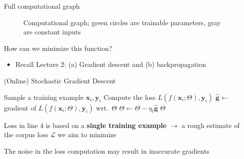 \documentclass[12pt,aspectratio=169,handout]{beamer}
\begin{document}
\begin{frame}{Full computational graph}
\begin{figure}
	\caption{Computational graph; green circles are trainable parameters, gray are constant inputs}
\end{figure}

How can we minimize this function?

\pause
\begin{itemize}
	\item Recall Lecture 2: (a) Gradient descent and (b) backpropagation
\end{itemize}

\end{frame}

\begin{frame}{(Online) Stochastic Gradient Descent}

\begin{algorithmic}[1]
		\State Sample a training example $\bm{x}_i, \bm{y}_i$
		\State Compute the loss $L(f(\bm{x}_i; \Theta), \bm{y}_i)$
		\State $\hat{\bm{g}} \gets$ gradient of $L(f(\bm{x}_i; \Theta), \bm{y}_i)$ wrt.\ $\Theta$
		\State $\Theta \gets \Theta - \eta_t \hat{\bm{g}}$
	\EndWhile
	\State \Return $\Theta$
	\EndFunction
\end{algorithmic}

\pause
Loss in line 4 is based on a \textbf{single training example} $\to$ a rough estimate of the corpus loss $\mathcal{L}$ we aim to minimize

\pause
The noise in the loss computation may result in inaccurate gradients

\end{frame}
\end{document}
